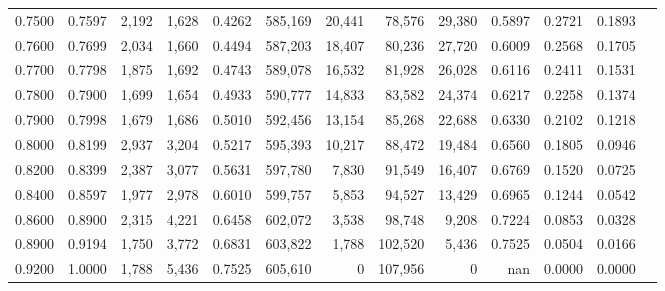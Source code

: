 \begin{tabular}{rrrrrrrrrrrrr}
0.7500 & 0.7597 &  2,192 & 1,628 &                                     0.4262 & 585,169 &  20,441 &  78,576 &  29,380 & 0.5897 & 0.2721 & 0.1893 \\
0.7600 & 0.7699 &  2,034 & 1,660 &                                     0.4494 & 587,203 &  18,407 &  80,236 &  27,720 & 0.6009 & 0.2568 & 0.1705 \\
0.7700 & 0.7798 &  1,875 & 1,692 &                                     0.4743 & 589,078 &  16,532 &  81,928 &  26,028 & 0.6116 & 0.2411 & 0.1531 \\
0.7800 & 0.7900 &  1,699 & 1,654 &                                     0.4933 & 590,777 &  14,833 &  83,582 &  24,374 & 0.6217 & 0.2258 & 0.1374 \\
0.7900 & 0.7998 &  1,679 & 1,686 &                                     0.5010 & 592,456 &  13,154 &  85,268 &  22,688 & 0.6330 & 0.2102 & 0.1218 \\
0.8000 & 0.8199 &  2,937 & 3,204 &                                     0.5217 & 595,393 &  10,217 &  88,472 &  19,484 & 0.6560 & 0.1805 & 0.0946 \\
0.8200 & 0.8399 &  2,387 & 3,077 &                                     0.5631 & 597,780 &   7,830 &  91,549 &  16,407 & 0.6769 & 0.1520 & 0.0725 \\
0.8400 & 0.8597 &  1,977 & 2,978 &                                     0.6010 & 599,757 &   5,853 &  94,527 &  13,429 & 0.6965 & 0.1244 & 0.0542 \\
0.8600 & 0.8900 &  2,315 & 4,221 &                                     0.6458 & 602,072 &   3,538 &  98,748 &   9,208 & 0.7224 & 0.0853 & 0.0328 \\
0.8900 & 0.9194 &  1,750 & 3,772 &                                     0.6831 & 603,822 &   1,788 & 102,520 &   5,436 & 0.7525 & 0.0504 & 0.0166 \\
0.9200 & 1.0000 &  1,788 & 5,436 &                                     0.7525 & 605,610 &       0 & 107,956 &       0 &    nan & 0.0000 & 0.0000 \\
\bottomrule
\end{tabular}
